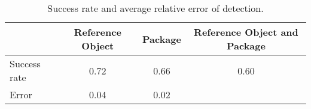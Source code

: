 \begin{table}%
\centering
\begin{tabular}{@{} l *3c @{}}
\toprule
 & {Reference Object}  & {Package}  & {Reference Object and Package}  \\ 
\midrule
Success rate & 0.72 & 0.66 & 0.60 \\ 
Error & 0.04 & 0.02 & \\
\bottomrule
 \end{tabular}
 \caption{Success rate and average relative error of detection.}
\label{table:detection_overall}
\end{table}